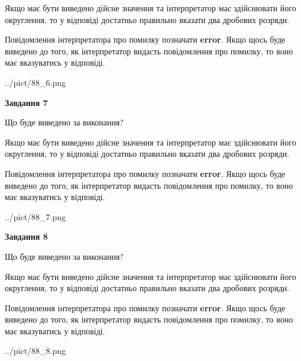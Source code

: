 \documentclass[12pt, ukrainian]{article}
\begin{document}
{\begin {Large}
Якщо має бути виведено дійсне значення та інтерпретатор має здійснювати його округлення, 
то у відповіді достатньо правильно вказати два дробових розряди.

Повідомлення інтерпретатора про помилку позначати \textbf{error}.
Якщо щось буде виведено до того, як інтерпретатор видасть повідомлення про помилку, 
то воно має вказуватись у відповіді. \par

\begin{center}
	{../pict/88_6.png}
\end{center}
\newpage

{\begin {center}\textbf{Завдання 7}\end {center}}\par
Що буде виведено за виконання? \par

Якщо має бути виведено дійсне значення та інтерпретатор має здійснювати його округлення, 
то у відповіді достатньо правильно вказати два дробових розряди.

Повідомлення інтерпретатора про помилку позначати \textbf{error}.
Якщо щось буде виведено до того, як інтерпретатор видасть повідомлення про помилку, 
то воно має вказуватись у відповіді. \par

\begin{center}
	{../pict/88_7.png}
\end{center}
\newpage

{\begin {center}\textbf{Завдання 8}\end {center}}\par
Що буде виведено за виконання? \par

Якщо має бути виведено дійсне значення та інтерпретатор має здійснювати його округлення, 
то у відповіді достатньо правильно вказати два дробових розряди.

Повідомлення інтерпретатора про помилку позначати \textbf{error}.
Якщо щось буде виведено до того, як інтерпретатор видасть повідомлення про помилку, 
то воно має вказуватись у відповіді. \par

\begin{center}
	{../pict/88_8.png}
\end{center}
\newpage


\end{Large}}
\end{document}
